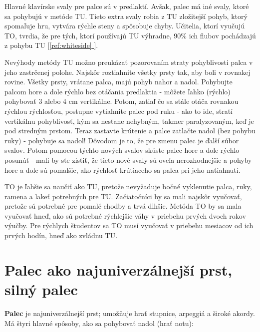 \documentclass[11pt,a4paper]{book}
\newcommand*{\fullref}[1]{\hyperref[{#1}]{\ref*{#1} \nameref*{#1}}} %
\newcommand*{\fullrefp}[1]{[\fullref{#1}]} %
\begin{document}
Hlavné klavírske svaly pre palce sú v predlaktí. Avšak, palec má iné svaly, ktoré sa pohybujú v metóde TU. Tieto extra svaly robia z TU zložitejší pohyb, ktorý spomaľuje hru, vytvára rýchle steny a spôsobuje chyby. Učitelia, ktorí vyučujú TO, tvrdia, že pre tých, ktorí používajú TU výhradne, 90\% ich flubov pochádzajú z pohybu TU \fullrefp{ref:whiteside}.

Nevýhody metódy TU možno preukázať pozorovaním straty pohyblivosti palca v jeho zastrčenej polohe. Najskôr roztiahnite všetky prsty tak, aby boli v rovnakej rovine. Všetky prsty, vrátane palca, majú pohyb nahor a nadol. Pohybujte palcom hore a dole rýchlo bez otáčania predlaktia - môžete ľahko (rýchlo) pohybovať 3 alebo 4 cm vertikálne. Potom, zatiaľ čo sa stále otáča rovnakou rýchlou rýchlosťou, postupne vytiahnite palec pod ruku - ako to ide, stratí vertikálnu pohyblivosť, kým sa nestane nehybným, takmer paralyzovaným, keď je pod stredným prstom. Teraz zastavte krútenie a palce zatlačte nadol (bez pohybu ruky) - pohybuje sa nadol! Dôvodom je to, že pre zmenu palec je ďalší súbor svalov. Potom pomocou týchto nových svalov skúste palec hore a dole rýchlo posunúť - mali by ste zistiť, že tieto nové svaly sú oveľa nerozhodnejšie a pohyby hore a dole sú pomalšie, ako rýchlosť krútiaceho sa palca pri jeho natiahnutí.

TO je ľahšie sa naučiť ako TU, pretože nevyžaduje bočné vyklenutie palca, ruky, ramena a lakeť potrebných pre TU. Začiatočníci by sa mali najskôr vyučovať, pretože sú potrebné pre pomalé chodby a trvá dlhšie. Metóda TO by sa mala vyučovať hneď, ako sú potrebné rýchlejšie váhy v priebehu prvých dvoch rokov výučby. Pre rýchlych študentov sa TO musí vyučovať v priebehu mesiacov od ich prvých hodín, hneď ako zvládnu TU.


\section{Palec ako najuniverzálnejší prst, silný palec}\label{s:thumb}
\textbf{Palec} je najuniverzálnejší prst; umožňuje hrať stupnice, arpeggiá a široké akordy. Má štyri hlavné spôsoby, ako sa pohybovať nadol (hrať notu):
\end{document}
